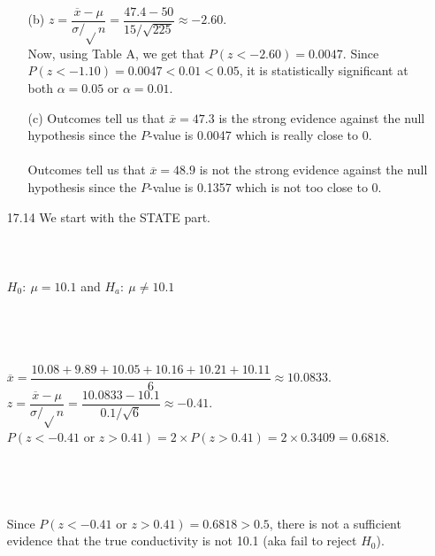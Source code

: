 \documentclass[11pt, a4paper]{article}
\newcommand\und[1]{\underline{\smash{#1}}}
\begin{document}
\begin{itemize}
\begin{itemize}
\item[(b)]
$z = \displaystyle\dfrac{\overline{x} - \mu}{\sigma/\sqrt{}n} = \displaystyle\dfrac{47.4 - 50}{15/\sqrt{225}} \approx -2.60$.\\
Now, using Table A, we get that $P(z < -2.60) = 0.0047$. Since $P(z < -1.10) = 0.0047 < 0.01 < 0.05$,
it is statistically significant at both $\alpha = 0.05$ or $\alpha = 0.01$.

\item[]

\item[(c)]
Outcomes tell us that $\overline{x} = 47.3$ is the strong evidence against
the null hypothesis since the $P$-value is 0.0047 which is really close to 0.
\\\\
Outcomes tell us that $\overline{x} = 48.9$ is not the strong evidence against
the null hypothesis since the $P$-value is 0.1357 which is not too close to 0.
\end{itemize}

\item[]
\item[]

\item[17.14]
We start with the STATE part.\\\\
\und{\textbf{STATE}}\\\\
$H_0: \ \mu = 10.1$ and $H_a: \ \mu \neq 10.1$
\\\\\\
\und{\textbf{SOLVE}}\\\\
$\overline{x} = \dfrac{10.08 + 9.89 + 10.05 + 10.16 + 10.21 + 10.11}{6} \approx 10.0833$.\\
$z = \displaystyle\dfrac{\overline{x} - \mu}{\sigma/\sqrt{}n} = \displaystyle\dfrac{10.0833 - 10.1}{0.1/\sqrt{6}} \approx -0.41$.\\
$P(z < -0.41 \text{ or } z > 0.41) = 2 \times P(z > 0.41) = 2 \times 0.3409 = 0.6818$.
\\\\\\
\und{\textbf{CONCLUDE}}\\\\
Since $P(z < -0.41 \text{ or } z > 0.41) = 0.6818 > 0.5$, there is not a sufficient evidence
that the true conductivity is not 10.1 (aka fail to reject $H_0$).

\item[]
\item[]


\end{itemize}
\end{document}

